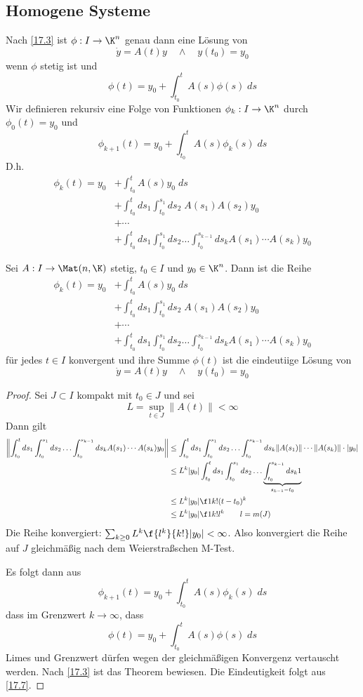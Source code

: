 \documentclass{mycourse}
\begin{document}
\subsection{Homogene Systeme}

Nach \ref{17.3} ist $\phi:I \to \K^n$ genau dann eine Lösung von
\[
	\dot y = A(t) y  \quad \land\quad y(t_0) = y_0
\]
wenn $\phi$ stetig ist und
\[
	\phi(t) = y_0 + \int_{t_0}^t A(s) \phi(s)\; ds
\]
Wir definieren rekursiv eine Folge von Funktionen $\phi_k: I \to \K^n$ durch $\phi_0(t) = y_0$ und
\[
	\phi_{k+1}(t) = y_0 + \int_{t_0}^tA(s)\phi_k(s) \;ds
\]
D.h.
\begin{align*}
	\phi_k(t) = y_0 &+ \int_{t_0}^tA(s)y_0\;ds \\
					&+ \int_{t_0}^tds_1\int_{t_0}^{s_1}ds_2 \; A(s_1)A(s_2)y_0 \\
		&+ \dotsb \\
	 &+ \int_{t_0}^tds_1 \int_{t_0}^{s_1}ds_2 \dotso \int_{t_0}^{s_{k-1}}ds_k A(s_1)\dotsb A(s_k)y_0
\end{align*}

\begin{thm}
	\label{17.8}
	Sei $A:I \to\Mat(n,\K)$ stetig, $t_0\in I$ und $y_0\in \K^n$. 
	Dann ist die Reihe 
	\begin{align*}
		\phi_k(t) = y_0 &+ \int_{t_0}^tA(s)y_0\;ds \\
						&+ \int_{t_0}^tds_1\int_{t_0}^{s_1}ds_2 \; A(s_1)A(s_2)y_0 \\
			&+ \dotsb \\
		 &+ \int_{t_0}^tds_1 \int_{t_0}^{s_1}ds_2 \dotso \int_{t_0}^{s_{k-1}}ds_k A(s_1)\dotsb A(s_k)y_0
	\end{align*}
	für jedes $t\in I$ konvergent und ihre Summe $\phi(t)$ ist die eindeutiige Lösung von 
	\[
		\dot y = A(t) y  \quad \land\quad y(t_0) = y_0
	\]
	\begin{proof}
		Sei $J\subset I$ kompakt mit $t_0\in J$ und sei
		\[
			L = \sup_{t\in J}\|A(t)\| < \infty
		\]
		Dann gilt
		\begin{align*}
			\left\|\int_{t_0}^t ds_1 \int_{t_0}^{s_1}ds_2 \dotso \int_{t_0}^{s_{k-1}}ds_k A(s_1) \dotsb A(s_k) y_0\right\|
			& \le \int_{t_0}^t ds_1 \int_{t_0}^{s_1}ds_2 \dotso \int_{t_0}^{s_{k-1}}ds_k \|A(s_1)\|\dotsb \|A(s_k)\|\cdot |y_0|\\
			& \le L^k|y_0| 	\int_{t_0}^t ds_1 \int_{t_0}^{s_1}ds_2 \dotso \underbrace{\int_{t_0}^{s_{k-1}}ds_k 1}_{s_{k-1}-t_0}\\ 
			& \le L^k|y_0| \f 1{k!}(t-t_0)^k\\
			& \le L^k|y_0| \f 1{k!} l^k \qquad l = m(J)
		\end{align*}
		Die Reihe konvergiert: $\sum_{k\ge 0}L^k \f{l^k}{k!}|y_0| < \infty$.
		Also konvergiert die Reihe auf $J$ gleichmäßig nach dem Weierstraßschen M-Test.

		Es folgt dann aus
		\[
			\phi_{k+1}(t) = y_0 + \int_{t_0}^t A(s) \phi_{k}(s) \;ds
		\]
		dass im Grenzwert $k\to \infty$, dass
		\[
			\phi(t) = y_0 + \int_{t_0}^t A(s) \phi(s)\; ds
		\]
		Limes und Grenzwert dürfen wegen der gleichmäßigen Konvergenz vertauscht werden.
		Nach \ref{17.3} ist das Theorem bewiesen.
		Die Eindeutigkeit folgt aus \ref{17.7}.
	\end{proof}
\end{thm}
\end{document}
